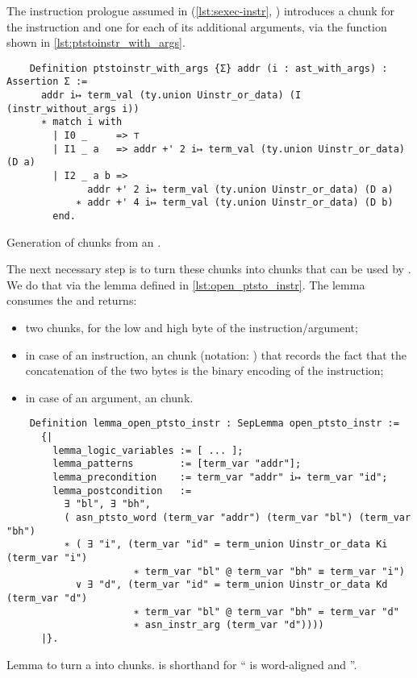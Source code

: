 The instruction prologue assumed in  (\cref{lst:sexec-instr}, ) introduces a  chunk for the instruction and one for each of its additional arguments, via the  function shown in \cref{lst:ptstoinstr_with_args}.

\begin{listing}[htb]
  \begin{verbatim}
    Definition ptstoinstr_with_args {Σ} addr (i : ast_with_args) : Assertion Σ :=
      addr i↦ term_val (ty.union Uinstr_or_data) (I (instr_without_args i))
      ∗ match i with
        | I0 _     => ⊤
        | I1 _ a   => addr +' 2 i↦ term_val (ty.union Uinstr_or_data) (D a)
        | I2 _ a b =>
              addr +' 2 i↦ term_val (ty.union Uinstr_or_data) (D a)
            ∗ addr +' 4 i↦ term_val (ty.union Uinstr_or_data) (D b)
        end.
  \end{verbatim}
  \caption{Generation of  chunks from an .}
  \label{lst:ptstoinstr_with_args}
\end{listing}

The next necessary step is to turn these  chunks into  chunks that can be used by . We do that via the  lemma defined in \ref{lst:open_ptsto_instr}. The lemma consumes the  and returns:
\begin{itemize}
\item two  chunks, for the low and high byte of the instruction/argument;
\item in case of an instruction, an  chunk (notation: ) that records the fact that the concatenation of the two bytes is the binary encoding of the instruction;
\item in case of an argument, an  chunk.
\end{itemize}

\begin{listing}[htb]
  \begin{verbatim}
    Definition lemma_open_ptsto_instr : SepLemma open_ptsto_instr :=
      {|
        lemma_logic_variables := [ ... ];
        lemma_patterns        := [term_var "addr"];
        lemma_precondition    := term_var "addr" i↦ term_var "id";
        lemma_postcondition   :=
          ∃ "bl", ∃ "bh",
          ( asn_ptsto_word (term_var "addr") (term_var "bl") (term_var "bh")
          ∗ ( ∃ "i", (term_var "id" = term_union Uinstr_or_data Ki (term_var "i")
                      ∗ term_var "bl" @ term_var "bh" ≡ term_var "i")
            ∨ ∃ "d", (term_var "id" = term_union Uinstr_or_data Kd (term_var "d")
                      ∗ term_var "bl" @ term_var "bh" = term_var "d"
                      ∗ asn_instr_arg (term_var "d"))))
      |}.
  \end{verbatim}
  \caption{Lemma to turn a  into  chunks.  is shorthand for `` is word-aligned and ''.}
  \label{lst:open_ptsto_instr}
\end{listing}

